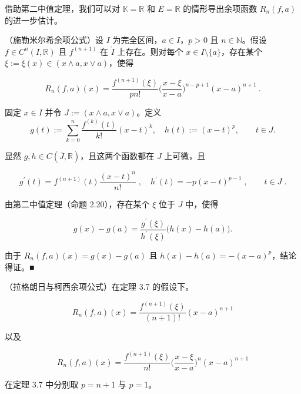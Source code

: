 借助第二中值定理，我们可以对 $ \mathbb{K} = \mathbb{R} $ 和 $ E = \mathbb{R} $ 的情形导出余项函数 $ R_n(f, a) $ 的进一步估计。

\begin{theorem}

（施勒米尔希余项公式）设 $ I $ 为完全区间，$ a \in I $，$ p > 0 $ 且 $ n \in \mathbb{N} $。假设 $ f \in C^n(I, \mathbb{R}) $ 且 $ f^{(n+1)} $ 在 $ \mathring{I} $ 上存在。则对每个 $ x \in I \setminus \{a\} $，存在某个 $ \xi := \xi(x) \in (x \land a, x \lor a) $，使得

\begin{equation}
R_{n}(f,a)(x)=\frac{f^{(n+1)}(\xi)}{p n!}\Big(\frac{x-\xi}{x-a}\Big)^{n-p+1}(x-a)^{n+1}~.
\end{equation}

\proofhead
固定 $x \in I$ 并令 $J := (x \land a, x \lor a)$。定义
\[
g(t):=\sum_{k=0}^{n}\frac{f^{(k)}(t)}{k!}(x-t)^{k},\quad h(t):=(x-t)^{p},\qquad t\in J.
\]

显然 $ g, h \in C(\overline{J}, \mathbb{R}) $，且这两个函数都在 $ J $ 上可微，且

\[
g^{\prime}(t)=f^{(n+1)}(t)\frac{(x-t)^{n}}{n!}\;,\quad h^{\prime}(t)=-p(x-t)^{p-1}\;,\qquad t\in J\;.
\]

由第二中值定理（命题 2.20），存在某个 $ \xi $ 位于 $ J $ 中，使得

\[
g(x)-g(a)=\frac{g^{\prime}(\xi)}{h^{\prime}(\xi)}\big(h(x)-h(a)\big).
\]

由于 $ R_{n}(f,a)(x)=g(x)-g(a) $ 且 $ h(x)-h(a)=-(x-a)^{p} $，结论得证。■

\end{theorem}

\begin{corollary}

（拉格朗日与柯西余项公式）在定理 3.7 的假设下。

\[
R_{n}(f,a)(x)=\frac{f^{(n+1)}(\xi)}{(n+1)!}(x-a)^{n+1}
\]

以及

\[
R_{n}(f,a)(x)=\frac{f^{(n+1)}(\xi)}{n!}\Big(\frac{x-\xi}{x-a}\Big)^{n}(x-a)^{n+1}
\]

\proofhead
在定理 3.7 中分别取 $p = n + 1$ 与 $p = 1$。
\end{corollary}

